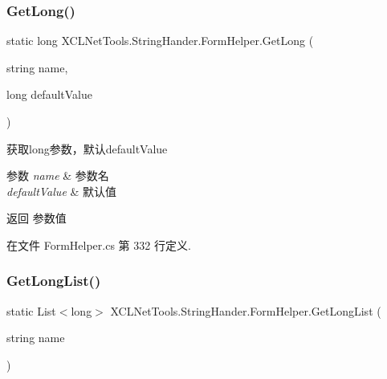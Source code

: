 \subsubsection{\texorpdfstring{Get\+Long()}{GetLong()}\hspace{0.1cm}{\footnotesize\ttfamily [2/2]}}
{\footnotesize\ttfamily static long X\+C\+L\+Net\+Tools.\+String\+Hander.\+Form\+Helper.\+Get\+Long (\begin{DoxyParamCaption}\item[{string}]{name,  }\item[{long}]{default\+Value }\end{DoxyParamCaption})\hspace{0.3cm}{\ttfamily [static]}}



获取long参数，默认default\+Value 


\begin{DoxyParams}{参数}
{\em name} & 参数名\\
\hline
{\em default\+Value} & 默认值\\
\hline
\end{DoxyParams}
\begin{DoxyReturn}{返回}
参数值
\end{DoxyReturn}


在文件 Form\+Helper.\+cs 第 332 行定义.

\mbox{\label{class_x_c_l_net_tools_1_1_string_hander_1_1_form_helper_ac00bef1db952ab0901c1813bbe193fa0}} 
\subsubsection{\texorpdfstring{Get\+Long\+List()}{GetLongList()}}
{\footnotesize\ttfamily static List$<$long$>$ X\+C\+L\+Net\+Tools.\+String\+Hander.\+Form\+Helper.\+Get\+Long\+List (\begin{DoxyParamCaption}\item[{string}]{name }\end{DoxyParamCaption})\hspace{0.3cm}{\ttfamily [static]}}




